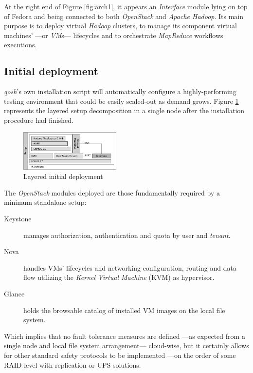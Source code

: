 \documentclass{sig-alternate}
\begin{document}
At the right end of Figure \ref{fig:arch1}, it appears an \emph{Interface} module lying on top of Fedora and being connected to both \emph{OpenStack} and \emph{Apache Hadoop}. Its main purpose is to deploy virtual \emph{Hadoop} clusters, to manage its component virtual machines' ---or \emph{VM}s--- lifecycles and to orchestrate \emph{MapReduce} workflows executions.



\subsection{Initial deployment}
\noindent \emph{qosh}'s own installation script will automatically configure a highly-performing testing environment that could be easily scaled-out as demand grows. Figure \ref{fig:initial} represents the layered setup decomposition in a single node after the installation procedure had finished.

\begin{figure}[tbp]
\centering
\includegraphics[width=0.45\textwidth]{img/005}
\caption{Layered initial deployment}
\label{fig:initial}
\end{figure}

The \emph{OpenStack} modules deployed are those fundamentally required by a minimum standalone setup:

\begin{description}
 \item[Keystone] manages authorization, authentication and quota by user and \emph{tenant}.
 \item[Nova] handles VMs' lifecycles and networking configuration, routing and data flow utilizing the \emph{Kernel Virtual Machine} (KVM) as hypervisor.
 \item[Glance] holds the browsable catalog of installed VM images on the local file system.
\end{description}

Which implies that no fault tolerance measures are defined ---as expected from a single node and local file system arrangement--- cloud-wise, but it certainly allows for other standard safety protocols to be implemented ---on the order of some RAID level with replication or UPS solutions.
\end{document}
